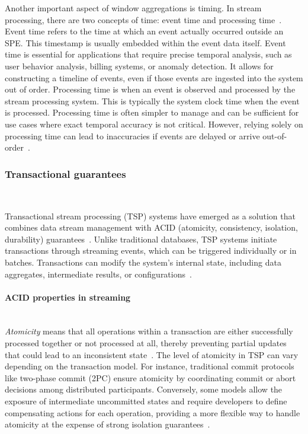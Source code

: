 Another important aspect of window aggregations is timing. In stream processing, there are two concepts of time: event time and processing time~\cite{Akidau:2015:DMP:2824032.2824076, carbone2015apache}. Event time refers to the time at which an event actually occurred outside an SPE. This timestamp is usually embedded within the event data itself. Event time is essential for applications that require precise temporal analysis, such as user behavior analysis, billing systems, or anomaly detection. It allows for constructing a timeline of events, even if those events are ingested into the system out of order. Processing time is when an event is observed and processed by the stream processing system. This is typically the system clock time when the event is processed. Processing time is often simpler to manage and can be sufficient for use cases where exact temporal accuracy is not critical. However, relying solely on processing time can lead to inaccuracies if events are delayed or arrive out-of-order~\cite{Akidau:2015:DMP:2824032.2824076, carbone2015apache}.

\subsubsection{Transactional guarantees}\mbox{} \\
\label{transactional}

Transactional stream processing (TSP) systems have emerged as a solution that combines data stream management with ACID (atomicity, consistency, isolation, durability) guarantees~\cite{zhang2024survey, affetti2020tspoon, botan2012transactional}. Unlike traditional databases, TSP systems initiate transactions through streaming events, which can be triggered individually or in batches. Transactions can modify the system's internal state, including data aggregates, intermediate results, or configurations~\cite{zhang2024survey}.

\paragraph{ACID properties in streaming} \mbox{} \\

{\em Atomicity} means that all operations within a transaction are either successfully processed together or not processed at all, thereby preventing partial updates that could lead to an inconsistent state~\cite{zhang2024survey}. The level of atomicity in TSP can vary depending on the transaction model. For instance, traditional commit protocols like two-phase commit (2PC) ensure atomicity by coordinating commit or abort decisions among distributed participants. Conversely, some models allow the exposure of intermediate uncommitted states and require developers to define compensating actions for each operation, providing a more flexible way to handle atomicity at the expense of strong isolation guarantees~\cite{10.1145/38713.38742}.

